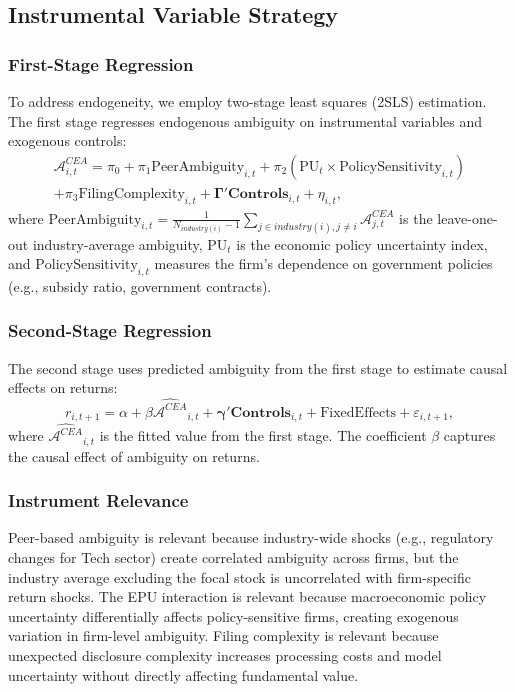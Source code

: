 \documentclass[preprint,12pt,authoryear]{elsarticle}
\begin{document}
\subsection{Instrumental Variable Strategy}

\subsubsection{First-Stage Regression}
To address endogeneity, we employ two-stage least squares (2SLS) estimation. The first stage regresses endogenous ambiguity on instrumental variables and exogenous controls:
\begin{equation}
\begin{split}
\mathcal{A}^{CEA}_{i,t} = \pi_0 + \pi_1 \text{PeerAmbiguity}_{i,t} + \pi_2 (\text{PU}_{t} \times \text{PolicySensitivity}_{i,t}) \\
+ \pi_3 \text{FilingComplexity}_{i,t} + \mathbf{\Gamma}'\mathbf{Controls}_{i,t} + \eta_{i,t},
\end{split}
\end{equation}
where $\text{PeerAmbiguity}_{i,t} = \frac{1}{N_{industry(i)}-1} \sum_{j \in industry(i), j \neq i} \mathcal{A}^{CEA}_{j,t}$ is the leave-one-out industry-average ambiguity, $\text{PU}_{t}$ is the economic policy uncertainty index, and $\text{PolicySensitivity}_{i,t}$ measures the firm's dependence on government policies (e.g., subsidy ratio, government contracts).

\subsubsection{Second-Stage Regression}
The second stage uses predicted ambiguity from the first stage to estimate causal effects on returns:
\begin{equation}
r_{i,t+1} = \alpha + \beta \widehat{\mathcal{A}^{CEA}}_{i,t} + \mathbf{\gamma}'\mathbf{Controls}_{i,t} + \text{FixedEffects} + \varepsilon_{i,t+1},
\end{equation}
where $\widehat{\mathcal{A}^{CEA}}_{i,t}$ is the fitted value from the first stage. The coefficient $\beta$ captures the causal effect of ambiguity on returns.

\subsubsection{Instrument Relevance}
Peer-based ambiguity is relevant because industry-wide shocks (e.g., regulatory changes for Tech sector) create correlated ambiguity across firms, but the industry average excluding the focal stock is uncorrelated with firm-specific return shocks. The EPU interaction is relevant because macroeconomic policy uncertainty differentially affects policy-sensitive firms, creating exogenous variation in firm-level ambiguity. Filing complexity is relevant because unexpected disclosure complexity increases processing costs and model uncertainty without directly affecting fundamental value.
\end{document}
